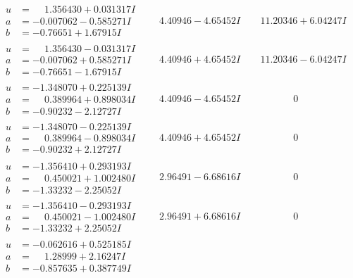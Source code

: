 \documentclass[1p]{elsarticle_modified}
\theoremstyle{definition}
\begin{document}
$$\begin{array}{c|c|c}
\begin{aligned}
u &= \phantom{-}1.356430 + 0.031317 I \\
a &= -0.007062 - 0.585271 I \\
b &= -0.76651 + 1.67915 I\end{aligned}
 & \phantom{-}4.40946 - 4.65452 I & \phantom{-}11.20346 + 6.04247 I \\ \hline\begin{aligned}
u &= \phantom{-}1.356430 - 0.031317 I \\
a &= -0.007062 + 0.585271 I \\
b &= -0.76651 - 1.67915 I\end{aligned}
 & \phantom{-}4.40946 + 4.65452 I & \phantom{-}11.20346 - 6.04247 I \\ \hline\begin{aligned}
u &= -1.348070 + 0.225139 I \\
a &= \phantom{-}0.389964 + 0.898034 I \\
b &= -0.90232 - 2.12727 I\end{aligned}
 & \phantom{-}4.40946 - 4.65452 I & \phantom{-0.000000 } 0 \\ \hline\begin{aligned}
u &= -1.348070 - 0.225139 I \\
a &= \phantom{-}0.389964 - 0.898034 I \\
b &= -0.90232 + 2.12727 I\end{aligned}
 & \phantom{-}4.40946 + 4.65452 I & \phantom{-0.000000 } 0 \\ \hline\begin{aligned}
u &= -1.356410 + 0.293193 I \\
a &= \phantom{-}0.450021 + 1.002480 I \\
b &= -1.33232 - 2.25052 I\end{aligned}
 & \phantom{-}2.96491 - 6.68616 I & \phantom{-0.000000 } 0 \\ \hline\begin{aligned}
u &= -1.356410 - 0.293193 I \\
a &= \phantom{-}0.450021 - 1.002480 I \\
b &= -1.33232 + 2.25052 I\end{aligned}
 & \phantom{-}2.96491 + 6.68616 I & \phantom{-0.000000 } 0 \\ \hline\begin{aligned}
u &= -0.062616 + 0.525185 I \\
a &= \phantom{-}1.28999 + 2.16247 I \\
b &= -0.857635 + 0.387749 I\end{aligned}

\end{array}$$
\end{document}

